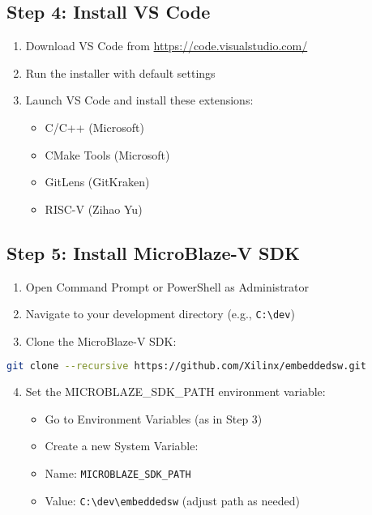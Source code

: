 \documentclass[11pt,a4paper]{article}
\begin{document}
\subsection{Step 4: Install VS Code}
\begin{enumerate}
    \item Download VS Code from \url{https://code.visualstudio.com/}
    \item Run the installer with default settings
    \item Launch VS Code and install these extensions:
    \begin{itemize}
        \item C/C++ (Microsoft)
        \item CMake Tools (Microsoft)
        \item GitLens (GitKraken)
        \item RISC-V (Zihao Yu)
    \end{itemize}
\end{enumerate}

\subsection{Step 5: Install MicroBlaze-V SDK}
\begin{enumerate}
    \item Open Command Prompt or PowerShell as Administrator
    \item Navigate to your development directory (e.g., \texttt{C:\textbackslash dev})
    \item Clone the MicroBlaze-V SDK:
\end{enumerate}

\begin{lstlisting}[language=bash]
git clone --recursive https://github.com/Xilinx/embeddedsw.git
\end{lstlisting}

\begin{enumerate}
    \setcounter{enumi}{3}
    \item Set the MICROBLAZE\_SDK\_PATH environment variable:
    \begin{itemize}
        \item Go to Environment Variables (as in Step 3)
        \item Create a new System Variable:
        \item Name: \texttt{MICROBLAZE\_SDK\_PATH}
        \item Value: \texttt{C:\textbackslash dev\textbackslash embeddedsw} (adjust path as needed)
    \end{itemize}
\end{enumerate}
\end{document}
